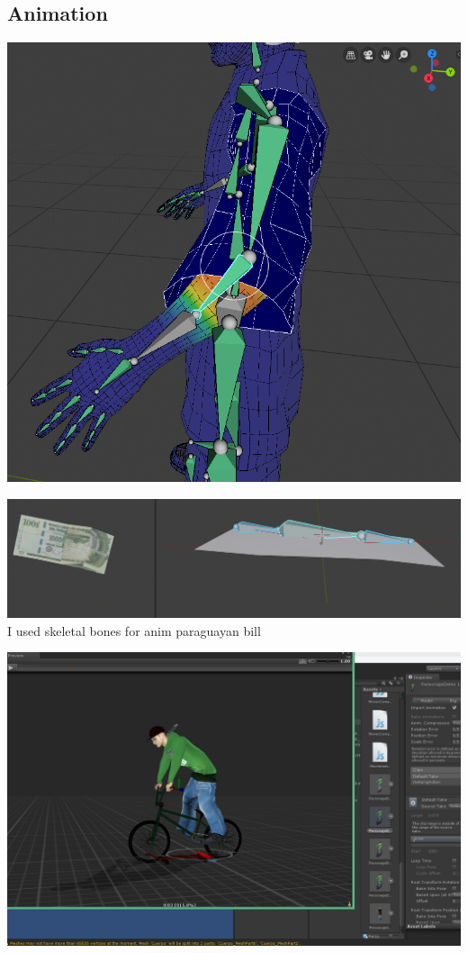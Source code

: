 \documentclass{article}
\begin{document}
  \subsection{Animation}
  \includegraphics[width=\textwidth]{30.png}

  \newpage
  
  \includegraphics[width=\textwidth]{31.png}
  I used skeletal bones for anim paraguayan bill

  \includegraphics[width=\textwidth]{28.png}
\end{document}
